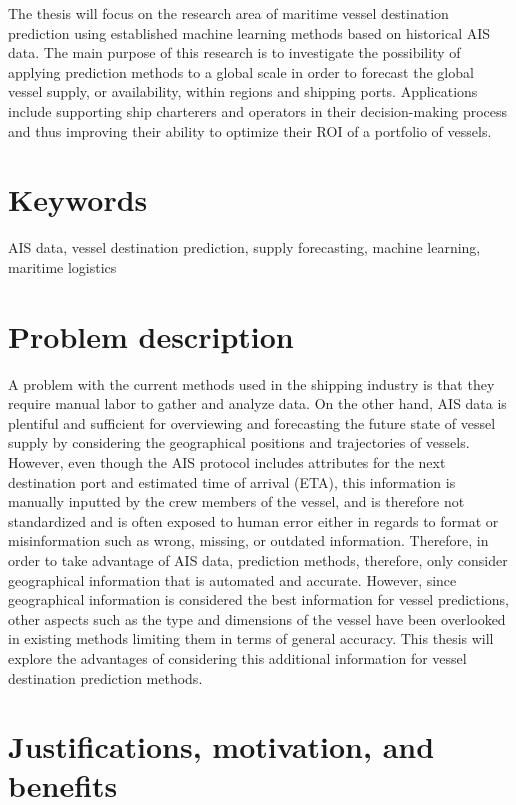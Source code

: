 The thesis will focus on the research area of maritime vessel destination prediction using established machine learning methods based on historical AIS data. The main purpose of this research is to investigate the possibility of applying prediction methods to a global scale in order to forecast the global vessel supply, or availability, within regions and shipping ports. Applications include supporting ship charterers and operators in their decision-making process and thus improving their ability to optimize their ROI of a portfolio of vessels.

\section{Keywords}

AIS data, vessel destination prediction, supply forecasting, machine learning, maritime logistics

\section{Problem description}

A problem with the current methods used in the shipping industry is that they require manual labor to gather and analyze data. On the other hand, AIS data is plentiful and sufficient for overviewing and forecasting the future state of vessel supply by considering the geographical positions and trajectories of vessels. However, even though the AIS protocol includes attributes for the next destination port and estimated time of arrival (ETA), this information is manually inputted by the crew members of the vessel, and is therefore not standardized and is often exposed to human error either in regards to format or misinformation such as wrong, missing, or outdated information. Therefore, in order to take advantage of AIS data, prediction methods, therefore, only consider geographical information that is automated and accurate. However, since geographical information is considered the best information for vessel predictions, other aspects such as the type and dimensions of the vessel have been overlooked in existing methods limiting them in terms of general accuracy. This thesis will explore the advantages of considering this additional information for vessel destination prediction methods.

\section{Justifications, motivation, and benefits}
\label{section:justifications_motivations_benefits}

